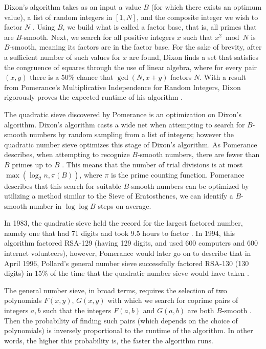 \documentclass[12pt]{amsart}
\theoremstyle{definition}
\begin{document}
Dixon's algorithm takes as an input a value $B$ (for which there exists an optimum value), a list of random integers in $[1,N]$, and the composite integer we wish to factor $N$ \cite{Dixon}. Using $B$, we build what is called a factor base, that is, all primes that are $B$-smooth. Next, we search for all positive integers $x$ such that $x^2 \bmod N$ is $B$-smooth, meaning its factors are in the factor base. For the sake of brevity, after a sufficient number of such values for $x$ are found, Dixon finds a set that satisfies the congruence of squares through the use of linear algebra, where for every pair $(x,y)$ there is a 50\% chance that $\gcd(N, x+y)$ factors $N$. With a result from Pomerance's Multiplicative Independence for Random Integers, Dixon rigorously proves the expected runtime of his algorithm \cite{Granville}.

The quadratic sieve discovered by Pomerance is an optimization on Dixon's algorithm. Dixon's algorithm casts a wide net when attempting to search for $B$-smooth numbers by random sampling from a list of integers; however the quadratic number sieve optimizes this stage of Dixon's algorithm. As Pomerance describes, when attempting to recognize $B$-smooth numbers, there are fewer than $B$ primes up to $B$ \cite{Pomerance1}. This means that the number of trial divisions is at most $\max(\log_2{n}, \pi(B))$, where $\pi$ is the prime counting function. Pomerance describes that this search for suitable $B$-smooth numbers can be optimized by utilizing a method similar to the Sieve of Eratosthenes, we can identify a $B$-smooth number in $\log\log B$ steps on average.

In 1983, the quadratic sieve held the record for the largest factored number, namely one that had 71 digits and took 9.5 hours to factor \cite{Pomerance2}. In 1994, this algorithm factored RSA-129 (having 129 digits, and used 600 computers and 600 internet volunteers), however, Pomerance would later go on to describe that in April 1996, Pollard's general number sieve successfully factored RSA-130 (130 digits) in 15\% of the time that the quadratic number sieve would have taken \cite{Pomerance0}. 

The general number sieve, in broad terms, requires the selection of two polynomials $F(x,y), \, G(x,y)$ with which we search for coprime pairs of integers $a,b$ such that the integers $F(a,b)$ and $G(a,b)$ are both $B$-smooth \cite{Bai}. Then the probability of finding such pairs (which depends on the choice of polynomials) is inversely proportional to the runtime of the algorithm. In other words, the higher this probability is, the faster the algorithm runs.
\end{document}
